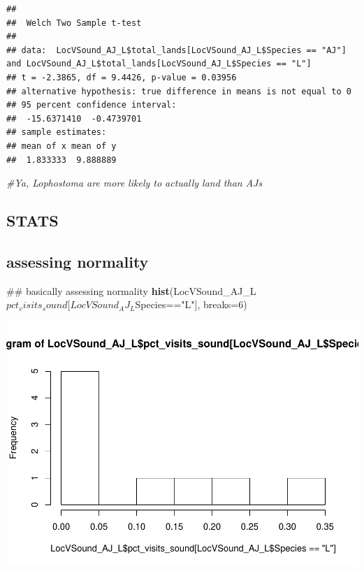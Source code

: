 \documentclass[]{article}
\newenvironment{Shaded}{\begin{snugshade}}{\end{snugshade}}
\newcommand{\KeywordTok}[1]{\textcolor[rgb]{0.13,0.29,0.53}{\textbf{{#1}}}}
\newcommand{\DataTypeTok}[1]{\textcolor[rgb]{0.13,0.29,0.53}{{#1}}}
\newcommand{\DecValTok}[1]{\textcolor[rgb]{0.00,0.00,0.81}{{#1}}}
\newcommand{\StringTok}[1]{\textcolor[rgb]{0.31,0.60,0.02}{{#1}}}
\newcommand{\CommentTok}[1]{\textcolor[rgb]{0.56,0.35,0.01}{\textit{{#1}}}}
\newcommand{\NormalTok}[1]{{#1}}
\begin{document}
\begin{verbatim}
## 
##  Welch Two Sample t-test
## 
## data:  LocVSound_AJ_L$total_lands[LocVSound_AJ_L$Species == "AJ"] and LocVSound_AJ_L$total_lands[LocVSound_AJ_L$Species == "L"]
## t = -2.3865, df = 9.4426, p-value = 0.03956
## alternative hypothesis: true difference in means is not equal to 0
## 95 percent confidence interval:
##  -15.6371410  -0.4739701
## sample estimates:
## mean of x mean of y 
##  1.833333  9.888889
\end{verbatim}

\begin{Shaded}
\begin{Highlighting}[]
\CommentTok{#Ya, Lophostoma are more likely to actually land than AJs}
\end{Highlighting}
\end{Shaded}

\subsection{STATS}\label{stats}

\subsection{assessing normality}\label{assessing-normality}

\begin{Shaded}
\begin{Highlighting}[]
\NormalTok{## basically assessing normality}
\KeywordTok{hist}\NormalTok{(LocVSound_AJ_L$pct_visits_sound[LocVSound_AJ_L$Species==}\StringTok{"L"}\NormalTok{], }\DataTypeTok{breaks=}\DecValTok{6}\NormalTok{)}
\end{Highlighting}
\end{Shaded}

\includegraphics{Sensory_learning_files/figure-latex/unnamed-chunk-7-1.pdf}
\end{document}
